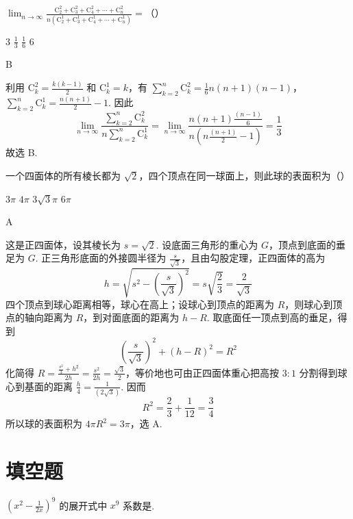 \begin{problem}
\(\displaystyle\lim_{n\to \infty}\frac{\mathrm C_2^2 + \mathrm C_3^2 + \mathrm C_4^2 + \cdots + \mathrm C_n^2}{n(\mathrm C_2^1 + \mathrm C_3^1 + \mathrm C_4^1 + \cdots + \mathrm C_n^1)} =\)（\quad）

\choices
    {3}
    {\(\frac{1}{3}\)}
    {\(\frac{1}{6}\)}
    {6}
\end{problem}

\begin{answer}
B
\end{answer}

\begin{solution}
利用 \(\mathrm C_k^2=\frac{k(k-1)}2\) 和 \(\mathrm C_k^1=k\)，有
\(\sum_{k=2}^n\mathrm C_k^2=\frac16n(n+1)(n-1)\)，\(\sum_{k=2}^n\mathrm C_k^1=\frac{n(n+1)}2-1\).
因此
\[
\lim_{n\to\infty}\frac{\sum_{k=2}^n\mathrm C_k^2}{n\sum_{k=2}^n\mathrm C_k^1}=\lim_{n\to\infty}\frac{n(n+1)\frac{(n-1)}{6}}{n\left(n\frac{(n+1)}{2}-1\right)}=\frac13
\]
故选 B.
\end{solution}

\begin{problem}
一个四面体的所有棱长都为 \(\sqrt{2}\)，四个顶点在同一球面上，则此球的表面积为（\quad）

\choices
    {\(3\pi\)}
    {\(4\pi\)}
    {\(3\sqrt{3}\pi\)}
    {\(6\pi\)}
\end{problem}

\begin{answer}
A
\end{answer}

\begin{solution}
这是正四面体，设其棱长为 \(s=\sqrt2\). 设底面三角形的重心为 \(G\)，顶点到底面的垂足为 \(G\). 正三角形底面的外接圆半径为 \(\frac{s}{\sqrt3}\)，且由勾股定理，正四面体的高为
\[
h=\sqrt{s^2-\left(\frac{s}{\sqrt3}\right)^2}=s\sqrt{\frac23}=\frac2{\sqrt3}
\]
四个顶点到球心距离相等，球心在高上；设球心到顶点的距离为 \(R\)，则球心到顶点的轴向距离为 \(R\)，到对面底面的距离为 \(h-R\). 取底面任一顶点到高的垂足，得到
\[
\left(\frac{s}{\sqrt3}\right)^2+(h-R)^2=R^2
\]
化简得 \(R=\frac{\frac{s^2}{3}+h^2}{2h}=\frac{s^2}{2h}=\frac{\sqrt3}{2}\)，等价地也可由正四面体重心把高按 \(3:1\) 分割得到球心到基面的距离 \(\frac{h}{4}=\frac{1}{(2\sqrt3)}\). 因而
\[
R^2=\frac23+\frac1{12}=\frac34
\]
所以球的表面积为 \(4\pi R^2=3\pi\)，选 A.
\end{solution}

\section{填空题}
\begin{problem}
\(\left(x^{2} - \frac{1}{2x}\right)^{9}\) 的展开式中 \(x^{9}\) 系数是\fillinblank{}.
\end{problem}

